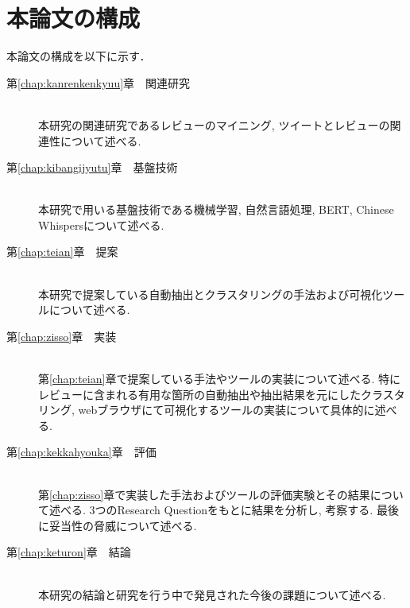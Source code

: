 \section{本論文の構成}
本論文の構成を以下に示す．
\begin{description}

\item[第\ref{chap:kanrenkenkyuu}章　関連研究]\mbox{}\\
本研究の関連研究であるレビューのマイニング, ツイートとレビューの関連性について述べる. \\

\item[第\ref{chap:kibangijyutu}章　基盤技術]\mbox{}\\
本研究で用いる基盤技術である機械学習, 自然言語処理, BERT, Chinese Whispersについて述べる. \\

\item[第\ref{chap:teian}章　提案]\mbox{}\\
本研究で提案している自動抽出とクラスタリングの手法および可視化ツールについて述べる. \\

\item[第\ref{chap:zisso}章　実装]\mbox{}\\
第\ref{chap:teian}章で提案している手法やツールの実装について述べる. 特にレビューに含まれる有用な箇所の自動抽出や抽出結果を元にしたクラスタリング, webブラウザにて可視化するツールの実装について具体的に述べる. \\

\item[第\ref{chap:kekkahyouka}章　評価]\mbox{}\\
第\ref{chap:zisso}章で実装した手法およびツールの評価実験とその結果について述べる. 3つのResearch Questionをもとに結果を分析し, 考察する. 最後に妥当性の脅威について述べる. \\

\item[第\ref{chap:keturon}章　結論]\mbox{}\\
本研究の結論と研究を行う中で発見された今後の課題について述べる. \\

\end{description}